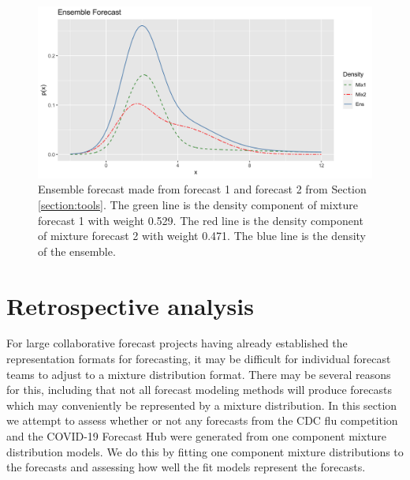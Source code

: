 \documentclass[11pt,notitlepage]{isuthesis}
\begin{document}
\begin{figure}[htbp]
\centerline{\includegraphics[scale=.15]{Images/mix_ense.png}}
\caption[Example ensemble forecast]{Ensemble forecast made from forecast 1 and 
forecast 2 from Section \ref{section:tools}. The green line is the density 
component of mixture forecast 1 with weight 0.529. The 
red line is the density component of mixture forecast 2 with weight 
0.471. The blue line is the density of the ensemble.}
\label{fig:mixense}
\end{figure}






















\chapter{Retrospective analysis}
\label{section:retrostud}

For large collaborative forecast projects having already established the 
representation formats for forecasting, it may be difficult for individual
forecast teams to adjust to a mixture distribution format. There may be several
reasons for this, including that not all 
forecast modeling methods will produce forecasts which may conveniently be
represented by a mixture distribution.
In this section we attempt to assess whether or not any forecasts from the CDC
flu competition and the COVID-19 Forecast Hub were generated from one component
mixture distribution models. We do this by fitting one component mixture 
distributions to the forecasts and assessing how well the fit models represent
the forecasts.
\end{document}
